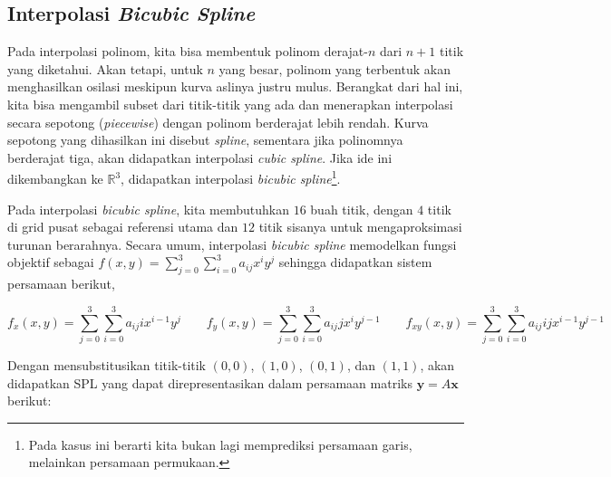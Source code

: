 \subsection{Interpolasi \textit{Bicubic Spline}}
Pada interpolasi polinom, kita bisa membentuk polinom derajat-$n$ dari $n+1$ titik yang diketahui. Akan tetapi, untuk $n$ yang besar, polinom yang terbentuk akan menghasilkan osilasi meskipun kurva aslinya justru mulus. Berangkat dari hal ini, kita bisa mengambil subset dari titik-titik yang ada dan menerapkan interpolasi secara sepotong (\textit{piecewise}) dengan polinom berderajat lebih rendah. Kurva sepotong yang dihasilkan ini disebut \textit{spline}, sementara jika polinomnya berderajat tiga, akan didapatkan interpolasi \textit{cubic spline}. Jika ide ini dikembangkan ke $\mathbb{R}^3$, didapatkan interpolasi \textit{bicubic spline}\footnote{Pada kasus ini berarti kita bukan lagi memprediksi persamaan garis, melainkan persamaan permukaan.}.

Pada interpolasi \textit{bicubic spline}, kita membutuhkan $16$ buah titik, dengan $4$ titik di grid pusat sebagai referensi utama dan $12$ titik sisanya untuk mengaproksimasi turunan berarahnya. Secara umum, interpolasi \textit{bicubic spline} memodelkan fungsi objektif sebagai $\displaystyle f(x, y) = \sum_{j = 0}^3 \sum_{i = 0}^3 a_{ij}x^iy^j$ sehingga didapatkan sistem persamaan berikut,

\[ f_x(x, y)  = \sum_{j = 0}^3 \sum_{i = 0}^3 a_{ij}ix^{i-1}y^j \qquad
   f_y(x, y)  = \sum_{j = 0}^3 \sum_{i = 0}^3 a_{ij}jx^iy^{j-1} \qquad
   f_{xy}(x, y) = \sum_{j = 0}^3 \sum_{i = 0}^3 a_{ij}ijx^{i-1}y^{j-1} \]

Dengan mensubstitusikan titik-titik $(0, 0)$, $(1, 0)$, $(0, 1)$, dan $(1, 1)$, akan didapatkan SPL yang dapat direpresentasikan dalam persamaan matriks $\boldsymbol{y} = A \boldsymbol{x}$ berikut:

